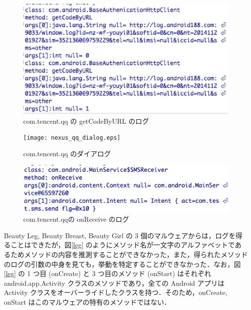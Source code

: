 \begin{figure}[t]
\begin{center}
\graphicspath{{./epsfiles/}}
\includegraphics[scale=0.5]{baseauthentication_qq.eps}
\end{center}
\caption{com.tencent.qq の getCodeByURL のログ}
\label{qqauthentication}
\end{figure}


\begin{figure}[t]
\begin{center}
\graphicspath{{./epsfiles/}}
\texttt{[image: nexus\_qq\_dialog.eps]}
\end{center}
\caption{com.tencent.qq のダイアログ}
\label{dialog}
\end{figure}

\begin{figure}[t]
\begin{center}
\graphicspath{{./epsfiles/}}
\includegraphics[scale=0.3]{SmsReceiver_qq.eps}
\end{center}
\caption{com.tencent.qqの onReceive のログ}
\label{qqreceive}
\end{figure}

Beauty Leg, Beauty Breast, Beauty Girl の 3 個のマルウェアからは，ログを得ることはできたが，図\ref{leg} のようにメソッド名が一文字のアルファベットであるためメソッドの内容を推測することができなかった，また，得られたメソッドのログの引数の中身を見ても，挙動を特定することができなかった．なお，図\ref{leg} の 1 つ目 (onCreate) と 3 つ目のメソッド (onStart) はそれぞれ android.app.Activity クラスのメソッドであり，全ての Android アプリは Activity クラスをオーバーライドしたクラスを持つ．そのため，onCreate, onStart はこのマルウェアの特有のメソッドではない．

